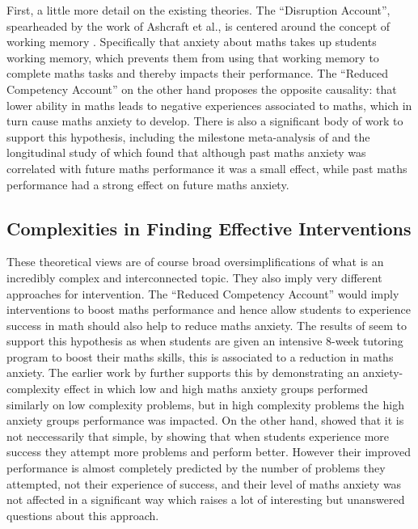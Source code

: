 \documentclass[14pt]{memoir}
\begin{document}
First, a little more detail on the existing theories. The ``Disruption Account'', spearheaded by the work of Ashcraft et al., is centered around the concept of working memory \cite{Ashcraft2001, Ashcraft2007}. Specifically that anxiety about maths takes up students working memory, which prevents them from using that working memory to complete maths tasks and thereby impacts their performance. The ``Reduced Competency Account'' on the other hand proposes the opposite causality: that lower ability in maths leads to negative experiences associated to maths, which in turn cause maths anxiety to develop. There is also a significant body of work to support this hypothesis, including the milestone meta-analysis of  and the longitudinal study of  which found that although past maths anxiety was correlated with future maths performance it was a small effect, while past maths performance had a strong effect on future maths anxiety.



\subsection*{Complexities in Finding Effective Interventions}

These theoretical views are of course broad oversimplifications of what is an incredibly complex and interconnected topic. They also imply very different approaches for intervention. The ``Reduced Competency Account'' would imply interventions to boost maths performance and hence allow students to experience success in math should also help to reduce maths anxiety. The results of   seem to support this hypothesis as when students are given an intensive 8-week tutoring program to boost their maths skills, this is associated to a reduction in maths anxiety. The earlier work by  further supports this by demonstrating an anxiety-complexity effect in which low and high maths anxiety groups performed similarly on low complexity problems, but in high complexity problems the high anxiety groups performance was impacted. On the other hand,  showed that it is not neccessarily that simple, by showing that when students experience more success they attempt more problems and perform better. However their improved performance is almost completely predicted by the number of problems they attempted, not their experience of success, and their level of maths anxiety was not affected in a significant way which raises a lot of interesting but unanswered questions about this approach. 
	
\end{document}
